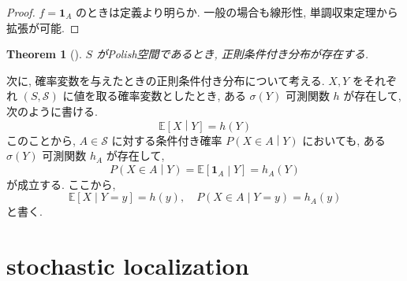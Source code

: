 \documentclass[11pt]{article}
\theoremstyle{breakstyle}
\newtheorem{theorem}{Theorem}[section]
\newcommand{\ind}[1]{\mathbf{1}_{#1}}
\begin{document}
\begin{proof}
    $f=\ind{A}$ のときは定義より明らか. 一般の場合も線形性, 単調収束定理から拡張が可能.
\end{proof}
\begin{theorem}[\cite{durrett2019probability}]
    $S$ がPolish空間であるとき, 正則条件付き分布が存在する.
\end{theorem}
次に, 確率変数を与えたときの正則条件付き分布について考える.
$X, Y$ をそれぞれ $(S,\mathcal{S})$ に値を取る確率変数としたとき, ある $\sigma(Y)$ 可測関数 $h$ が存在して, 
次のように書ける\citep[Theorem~23.2]{jacodprotter2004probability}.
\begin{equation*}
    \mathbb{E}\left[X\middle|Y\right]=h(Y)
\end{equation*}
このことから, $A\in \mathcal{S}$ に対する条件付き確率 $P\left(X\in A\middle|Y\right)$ においても, ある $\sigma(Y)$ 可測関数 $h_A$ が存在して, 
\begin{equation*}
    P\left(X\in A\middle|Y\right)=\mathbb{E}\left[\ind{A}\middle|Y\right]=h_A(Y)
\end{equation*}
が成立する.
ここから, 
\begin{equation*}
    \mathbb{E}\left[X\middle|Y=y\right]=h(y), \quad P\left(X\in A\middle|Y=y\right)=h_A(y)
\end{equation*}
と書く.
\section{stochastic localization}
\end{document}

